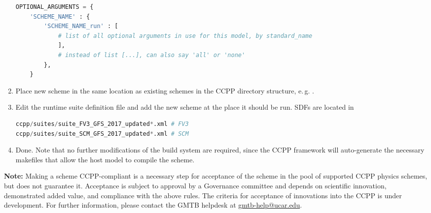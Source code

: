 \begin{enumerate}
\begin{lstlisting}[language=Python]
OPTIONAL_ARGUMENTS = {
    'SCHEME_NAME' : {
        'SCHEME_NAME_run' : [
            # list of all optional arguments in use for this model, by standard_name
            ],
            # instead of list [...], can also say 'all' or 'none'
        },
    }
\end{lstlisting}
\item Place new scheme in the same location as existing schemes in the CCPP directory structure, e.\,g. .
\item Edit the runtime suite definition file and add the new scheme at the place it should be run. SDFs are located in
\begin{lstlisting}[language=Python]
ccpp/suites/suite_FV3_GFS_2017_updated*.xml # FV3
ccpp/suites/suite_SCM_GFS_2017_updated*.xml # SCM
\end{lstlisting}
\item Done. Note that no further modifications of the build system are required, since the CCPP framework will auto-generate the necessary makefiles that allow the host model to compile the scheme.
\end{enumerate}
\textbf{Note:} Making a scheme CCPP-compliant is a necessary step for acceptance of the scheme in the pool of supported CCPP physics schemes, but does not guarantee it. Acceptance is subject to approval by a Governance committee and depends on scientific innovation, demonstrated added value, and compliance with the above rules. The criteria for acceptance of innovations into the CCPP is under development. For further information, please contact the GMTB helpdesk at \url{gmtb-help@ucar.edu}.
